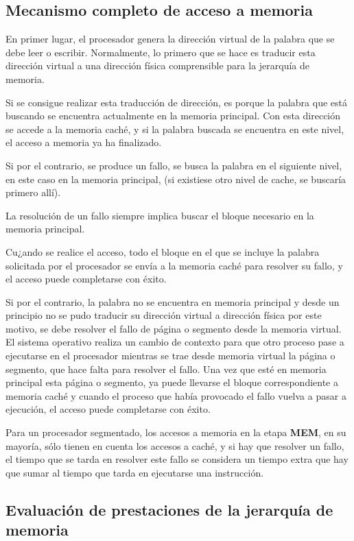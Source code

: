 \subsection{Mecanismo completo de acceso a memoria}

En primer lugar, el procesador genera la dirección virtual de la palabra que se debe leer o escribir. Normalmente, lo primero que se hace es traducir esta dirección virtual a una dirección física comprensible para la jerarquía de memoria.

Si se consigue realizar esta traducción de dirección, es porque la palabra que está buscando se encuentra actualmente en la memoria principal. Con esta dirección se accede a la memoria caché, y si la palabra buscada se encuentra en este nivel, el acceso a memoria ya ha finalizado.

Si por el contrario, se produce un fallo, se busca la palabra en el siguiente nivel, en este caso en la memoria principal, (si existiese otro nivel de cache, se buscaría primero allí).

La resolución de un fallo siempre implica buscar el bloque necesario en la memoria principal.

Cu¿ando se realice el acceso, todo el bloque en el que se incluye la palabra solicitada por el procesador se envía a la memoria caché para resolver su fallo, y el acceso puede completarse con éxito.

Si por el contrario, la palabra no se encuentra en memoria principal y desde un principio no se pudo traducir su dirección virtual a dirección física por este motivo, se debe resolver el fallo de página o segmento desde la memoria virtual. El sistema operativo realiza un cambio de contexto para que otro proceso pase a ejecutarse en el procesador mientras se trae desde memoria virtual la página o segmento, que hace falta para resolver el fallo. Una vez que esté en memoria principal esta página o segmento, ya puede llevarse el bloque correspondiente a memoria caché y cuando el proceso que había provocado el fallo vuelva a pasar a ejecución, el acceso puede completarse con éxito.

Para un procesador segmentado, los accesos a memoria en la etapa \textbf{MEM}, en su mayoría, sólo tienen en cuenta los accesos a caché, y si hay que resolver un fallo, el tiempo que se tarda en resolver este fallo se considera un tiempo extra que hay que sumar al tiempo que tarda en ejecutarse una instrucción. 

\subsection{Evaluación de prestaciones de la jerarquía de memoria}

